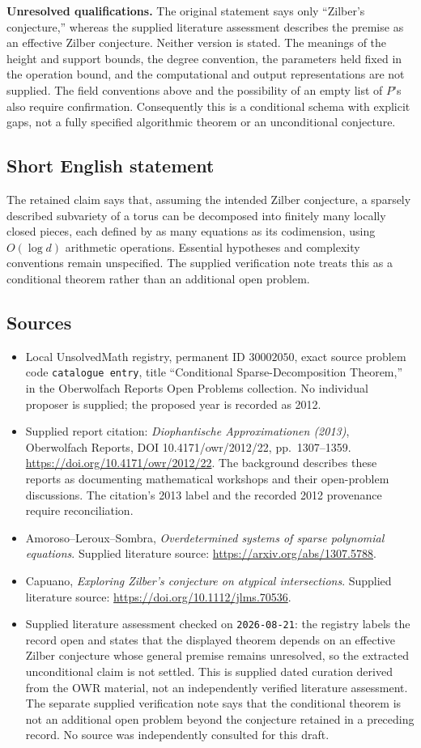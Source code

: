 \documentclass[11pt]{article}
\begin{document}
\textbf{Unresolved qualifications.} The original statement says only ``Zilber's conjecture,'' whereas the supplied literature assessment describes the premise as an effective Zilber conjecture. Neither version is stated. The meanings of the height and support bounds, the degree convention, the parameters held fixed in the operation bound, and the computational and output representations are not supplied. The field conventions above and the possibility of an empty list of \(P\)'s also require confirmation. Consequently this is a conditional schema with explicit gaps, not a fully specified algorithmic theorem or an unconditional conjecture.
\subsection{Short English statement}
The retained claim says that, assuming the intended Zilber conjecture, a sparsely described subvariety of a torus can be decomposed into finitely many locally closed pieces, each defined by as many equations as its codimension, using \(O(\log d)\) arithmetic operations. Essential hypotheses and complexity conventions remain unspecified. The supplied verification note treats this as a conditional theorem rather than an additional open problem.
\subsection{Sources}
\begin{itemize}
\item Local UnsolvedMath registry, permanent ID \(30002050\), exact source problem code \texttt{catalogue entry}, title ``Conditional Sparse-Decomposition Theorem,'' in the Oberwolfach Reports Open Problems collection. No individual proposer is supplied; the proposed year is recorded as 2012.
\item Supplied report citation: \emph{Diophantische Approximationen (2013)}, Oberwolfach Reports, DOI 10.4171/owr/2012/22, pp.\ 1307--1359. \url{https://doi.org/10.4171/owr/2012/22}. The background describes these reports as documenting mathematical workshops and their open-problem discussions. The citation's 2013 label and the recorded 2012 provenance require reconciliation.
\item Amoroso--Leroux--Sombra, \emph{Overdetermined systems of sparse polynomial equations}. Supplied literature source: \url{https://arxiv.org/abs/1307.5788}.
\item Capuano, \emph{Exploring Zilber's conjecture on atypical intersections}. Supplied literature source: \url{https://doi.org/10.1112/jlms.70536}.
\item Supplied literature assessment checked on \texttt{2026-08-21}: the registry labels the record open and states that the displayed theorem depends on an effective Zilber conjecture whose general premise remains unresolved, so the extracted unconditional claim is not settled. This is supplied dated curation derived from the OWR material, not an independently verified literature assessment. The separate supplied verification note says that the conditional theorem is not an additional open problem beyond the conjecture retained in a preceding record. No source was independently consulted for this draft.
\end{itemize}
\end{document}
